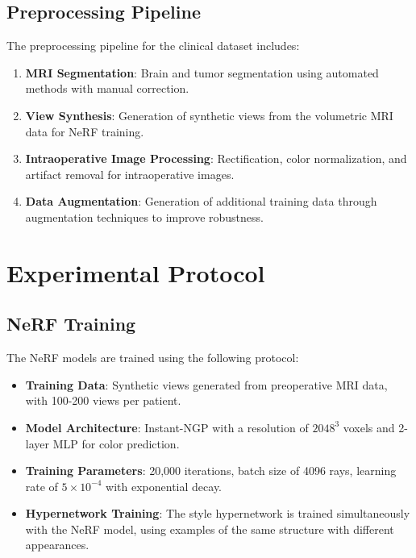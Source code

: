 \subsection{Preprocessing Pipeline}

The preprocessing pipeline for the clinical dataset includes:

\begin{enumerate}
    \item \textbf{MRI Segmentation}: Brain and tumor segmentation using automated methods with manual correction.
    
    \item \textbf{View Synthesis}: Generation of synthetic views from the volumetric MRI data for NeRF training.
    
    \item \textbf{Intraoperative Image Processing}: Rectification, color normalization, and artifact removal for intraoperative images.
    
    \item \textbf{Data Augmentation}: Generation of additional training data through augmentation techniques to improve robustness.
\end{enumerate}

\section{Experimental Protocol}

\subsection{NeRF Training}

The NeRF models are trained using the following protocol:

\begin{itemize}
    \item \textbf{Training Data}: Synthetic views generated from preoperative MRI data, with 100-200 views per patient.
    
    \item \textbf{Model Architecture}: Instant-NGP with a resolution of $2048^3$ voxels and 2-layer MLP for color prediction.
    
    \item \textbf{Training Parameters}: 20,000 iterations, batch size of 4096 rays, learning rate of $5 \times 10^{-4}$ with exponential decay.
    
    \item \textbf{Hypernetwork Training}: The style hypernetwork is trained simultaneously with the NeRF model, using examples of the same structure with different appearances.
\end{itemize}

